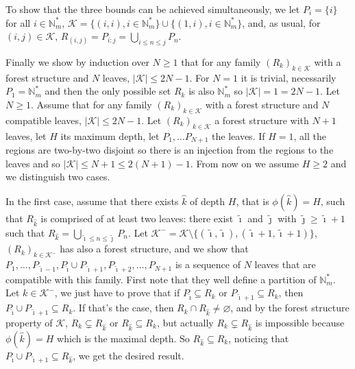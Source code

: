 \documentclass[
  11pt,
  a4paper,
]{article}
\theoremstyle{plain}
\theoremstyle{plain}
\theoremstyle{definition}
\theoremstyle{plain}
\theoremstyle{definition}
\theoremstyle{remark}
\begin{document}
To show that the three bounds can be achieved simultaneously, we let
\(P_i=\{i\}\) for all \(i\in\mathbb{N}_m^*\),
\(\mathcal{K}=\{(i,i), i\in\mathbb{N}_m^*\}\cup\{(1,i), i\in\mathbb{N}_m^*\}\),
and, as usual, for \((i,j)\in\mathcal{K}\),
\(R_{(i,j)}=P_{i:j}=\bigcup_{i\leq n\leq j}P_n\).

Finally we show by induction over \(N\geq1\) that for any family
\((R_k)_{k\in\mathcal{K}}\) with a forest structure and \(N\) leaves,
\(|\mathcal{K}|\leq 2N-1\). For \(N=1\) it is trivial, necessarily
\(P_1=\mathbb{N}_m^*\) and then the only possible set \(R_k\) is also
\(\mathbb{N}_m^*\) so \(|\mathcal{K}|=1=2N-1\). Let \(N\geq 1\). Assume
that for any family \((R_k)_{k\in\mathcal{K}}\) with a forest structure
and \(N\) compatible leaves, \(|\mathcal{K}|\leq 2N-1\). Let
\((R_k)_{k\in\mathcal{K}}\) a forest structure with \(N+1\) leaves, let
\(H\) its maximum depth, let \(P_1, \dotsc P_{N+1}\) the leaves. If
\(H=1\), all the regions are two-by-two disjoint so there is an
injection from the regions to the leaves and so
\(|\mathcal{K}|\leq N+1\leq 2(N+1)-1\). From now on we assume \(H\geq2\)
and we distinguish two cases.

In the first case, assume that there exists \(\hat k\) of depth \(H\),
that is \(\phi(\hat k)=H\), such that \(R_{\hat k}\) is comprised of at
least two leaves: there exist \(\tilde\imath\) and \(\tilde\jmath\) with
\(\tilde\jmath\geq\tilde\imath+1\) such that
\(R_{\hat k}=\bigcup_{\tilde\imath\leq n\leq \tilde\jmath}P_n\). Let
\(\mathcal{K}^-=\mathcal{K}\setminus\{(\tilde\imath, \tilde\imath), (\tilde\imath+1, \tilde\imath+1)\}\),
\((R_k)_{k\in\mathcal{K}^-}\) has also a forest structure, and we show
that
\(P_1,\dotsc,P_{\tilde\imath-1}, P_{\tilde\imath}\cup P_{\tilde\imath+1},P_{\tilde\imath+2},\dotsc,P_{N+1}\)
is a sequence of \(N\) leaves that are compatible with this family.
First note that they well define a partition of \(\mathbb{N}_m^*\). Let
\(k\in\mathcal{K}^-\), we just have to prove that if
\(P_{\tilde\imath}\subseteq R_k\) or
\(P_{\tilde\imath+1}\subseteq R_k\), then
\(P_{\tilde\imath}\cup P_{\tilde\imath+1}\subseteq R_k\). If that's the
case, then \(R_k\cap R_{\hat k}\neq\varnothing\), and by the forest
structure property of \(\mathcal{K}\), \(R_k\subsetneq R_{\hat k}\) or
\(R_{\hat k}\subseteq R_k\), but actually \(R_k\subsetneq R_{\hat k}\)
is impossible because \(\phi(\hat k)=H\) which is the maximal depth. So
\(R_{\hat k}\subseteq R_k\), noticing that
\(P_{\tilde\imath}\cup P_{\tilde\imath+1}\subseteq R_{\hat k}\), we get
the desired result.
\end{document}
